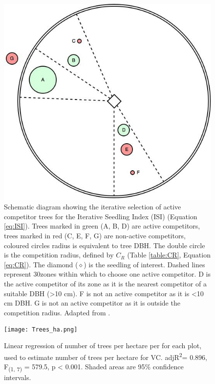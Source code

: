 \documentclass[a4paper,10pt,]{report}
\begin{document}
\begin{figure}[H]
\centering
\includegraphics[scale=0.5]{hegyi.jpg}
\caption{Schematic diagram showing the iterative selection of active competitor trees for the Iterative Seedling Index (ISI) (Equation \ref{eq:ISI}). Trees marked in green (A, B, D) are active competitors, trees marked in red (C, E, F, G) are non-active competitors, coloured circles radius is equivalent to tree DBH. The double circle is the competition radius, defined by $C_R$ (Table \ref{table:CR}, Equation \ref{eq:CR}). The diamond ($\diamond$) is the seedling of interest. Dashed lines represent 30\textdegree \space zones within which to choose one active competitor. D is the active competitor of its zone as it is the nearest competitor of a suitable DBH (>10 cm). F is not an active competitor as it is <10 cm DBH. G is not an active competitor as it is outside the competition radius. Adapted from \citet{Lee2004}.}
\label{fig:hegyi}
\end{figure}

\begin{figure}[H]
\centering
\texttt{[image: Trees\_ha.png]}
\caption{Linear regression of number of trees per hectare per for each plot, used to estimate number of trees per hectare for {\color{red}VC}. adjR\textsuperscript{2}= 0.896, F\textsubscript{(1, 7)} = 579.5, p < 0.001. Shaded areas are 95\% confidence intervals.}
\label{fig:Trees_ha}
\end{figure}
\end{document}
